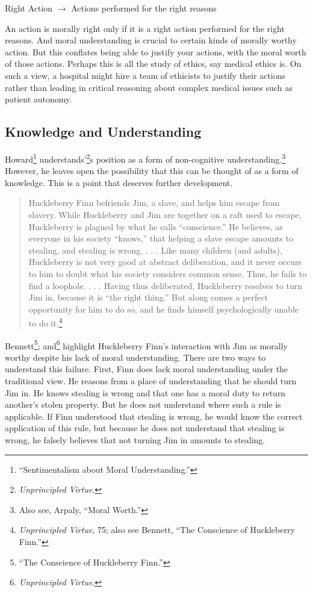 \documentclass[phdthesis,12pt,final,a4paper]{wuthesis}
\theoremstyle{definition}
\theoremstyle{definition}
\theoremstyle{definition}
\theoremstyle{definition}
\theoremstyle{remark}
\begin{document}
Right Action \(\rightarrow\) Actions performed for the right reasons

An action is morally right only if it is a right action performed for the right reasons. And moral understanding is crucial to certain kinds of morally worthy action. But this conflates being able to justify your actions, with the moral worth of those actions. Perhaps this is all the study of ethics, say medical ethics is. On such a view, a hospital might hire a team of ethicists to justify their actions rather than leading in critical reasoning about complex medical issues such as patient autonomy.

\subsection*{Knowledge and Understanding}\label{knowledge-and-understanding}

Howard\footnote{{``Sentimentalism about {Moral Understanding}.''}} understands'\footnote{\emph{Unprincipled {Virtue}}.}s position as a form of non-cognitive understanding.\footnote{Also see, Arpaly, {``Moral {Worth}.''}} However, he leaves open the possibility that this can be thought of as a form of knowledge. This is a point that deserves further development.

\begin{quote}
Huckleberry Finn befriends Jim, a slave, and helps him escape from slavery. While Huckleberry and Jim are together on a raft used to escape, Huckleberry is plagued by what he calls ``conscience.'' He believes, as everyone in his society ``knows,'' that helping a slave escape amounts to stealing, and stealing is wrong. . . . Like many children (and adults), Huckleberry is not very good at abstract deliberation, and it never occurs to him to doubt what his society considers common sense. Thus, he fails to find a loophole. . . . Having thus deliberated, Huckleberry resolves to turn Jim in, because it is ``the right thing.'' But along comes a perfect opportunity for him to do so, and he finds himself psychologically unable to do it.\footnote{\emph{Unprincipled {Virtue}}, 75; also see Bennett, {``The {Conscience} of {Huckleberry Finn}.''}}
\end{quote}

Bennett\footnote{{``The {Conscience} of {Huckleberry Finn}.''}}; and\footnote{\emph{Unprincipled {Virtue}}.} highlight Huckleberry Finn's interaction with Jim as morally worthy despite his lack of moral understanding. There are two ways to understand this failure. First, Finn does lack moral understanding under the traditional view. He reasons from a place of understanding that he should turn Jim in. He knows stealing is wrong and that one has a moral duty to return another's stolen property. But he does not understand where such a rule is applicable. If Finn understood that stealing is wrong, he would know the correct application of this rule, but because he does not understand that stealing is wrong, he falsely believes that not turning Jim in amounts to stealing.
\end{document}
